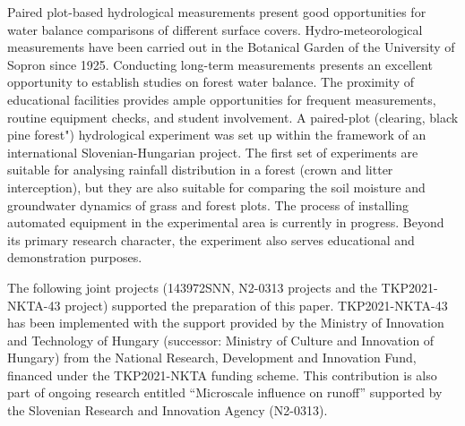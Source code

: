 Paired plot-based hydrological measurements present good opportunities for water balance comparisons of different surface covers. Hydro-meteorological measurements have been carried out in the Botanical Garden of the University of Sopron since 1925. Conducting long-term measurements presents an excellent opportunity to establish studies on forest water balance. The proximity of educational facilities provides ample opportunities for frequent measurements, routine equipment checks, and student involvement. A paired-plot (clearing, black pine forest") hydrological experiment was set up within the framework of an international Slovenian-Hungarian project. The first set of experiments are suitable for analysing rainfall distribution in a forest (crown and litter interception), but they are also suitable for comparing the soil moisture and groundwater dynamics of grass and forest plots. The process of installing automated equipment in the experimental area is currently in progress. Beyond its primary research character, the experiment also serves educational and demonstration purposes.

The following joint projects (143972SNN, N2-0313 projects and the TKP2021-NKTA-43 project) supported the preparation of this paper. TKP2021-NKTA-43 has been implemented with the support provided by the Ministry of Innovation and Technology of Hungary (successor: Ministry of Culture and Innovation of Hungary) from the National Research, Development and Innovation Fund, financed under the TKP2021-NKTA funding scheme. This contribution is also part of ongoing research entitled “Microscale influence on runoff” supported by the Slovenian Research and Innovation Agency (N2-0313).
\newpage{}
{}
\begin{flushleft}






\end{flushleft}

